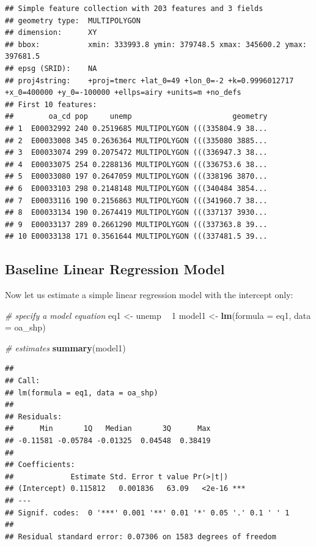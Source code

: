 \documentclass[]{book}
\newenvironment{Shaded}{\begin{snugshade}}{\end{snugshade}}
\newcommand{\KeywordTok}[1]{\textcolor[rgb]{0.13,0.29,0.53}{\textbf{#1}}}
\newcommand{\DataTypeTok}[1]{\textcolor[rgb]{0.13,0.29,0.53}{#1}}
\newcommand{\DecValTok}[1]{\textcolor[rgb]{0.00,0.00,0.81}{#1}}
\newcommand{\StringTok}[1]{\textcolor[rgb]{0.31,0.60,0.02}{#1}}
\newcommand{\CommentTok}[1]{\textcolor[rgb]{0.56,0.35,0.01}{\textit{#1}}}
\newcommand{\OperatorTok}[1]{\textcolor[rgb]{0.81,0.36,0.00}{\textbf{#1}}}
\newcommand{\NormalTok}[1]{#1}
\begin{document}
\begin{verbatim}
## Simple feature collection with 203 features and 3 fields
## geometry type:  MULTIPOLYGON
## dimension:      XY
## bbox:           xmin: 333993.8 ymin: 379748.5 xmax: 345600.2 ymax: 397681.5
## epsg (SRID):    NA
## proj4string:    +proj=tmerc +lat_0=49 +lon_0=-2 +k=0.9996012717 +x_0=400000 +y_0=-100000 +ellps=airy +units=m +no_defs
## First 10 features:
##        oa_cd pop     unemp                       geometry
## 1  E00032992 240 0.2519685 MULTIPOLYGON (((335804.9 38...
## 2  E00033008 345 0.2636364 MULTIPOLYGON (((335080 3885...
## 3  E00033074 299 0.2075472 MULTIPOLYGON (((336947.3 38...
## 4  E00033075 254 0.2288136 MULTIPOLYGON (((336753.6 38...
## 5  E00033080 197 0.2647059 MULTIPOLYGON (((338196 3870...
## 6  E00033103 298 0.2148148 MULTIPOLYGON (((340484 3854...
## 7  E00033116 190 0.2156863 MULTIPOLYGON (((341960.7 38...
## 8  E00033134 190 0.2674419 MULTIPOLYGON (((337137 3930...
## 9  E00033137 289 0.2661290 MULTIPOLYGON (((337363.8 39...
## 10 E00033138 171 0.3561644 MULTIPOLYGON (((337481.5 39...
\end{verbatim}

\subsection{Baseline Linear Regression
Model}\label{baseline-linear-regression-model}

Now let us estimate a simple linear regression model with the intercept
only:

\begin{Shaded}
\begin{Highlighting}[]
\CommentTok{# specify a model equation}
\NormalTok{eq1 <-}\StringTok{ }\NormalTok{unemp }\OperatorTok{~}\StringTok{ }\DecValTok{1}
\NormalTok{model1 <-}\StringTok{ }\KeywordTok{lm}\NormalTok{(}\DataTypeTok{formula =}\NormalTok{ eq1, }\DataTypeTok{data =}\NormalTok{ oa_shp)}

\CommentTok{# estimates}
\KeywordTok{summary}\NormalTok{(model1)}
\end{Highlighting}
\end{Shaded}

\begin{verbatim}
## 
## Call:
## lm(formula = eq1, data = oa_shp)
## 
## Residuals:
##      Min       1Q   Median       3Q      Max 
## -0.11581 -0.05784 -0.01325  0.04548  0.38419 
## 
## Coefficients:
##             Estimate Std. Error t value Pr(>|t|)    
## (Intercept) 0.115812   0.001836   63.09   <2e-16 ***
## ---
## Signif. codes:  0 '***' 0.001 '**' 0.01 '*' 0.05 '.' 0.1 ' ' 1
## 
## Residual standard error: 0.07306 on 1583 degrees of freedom
\end{verbatim}
\end{document}
